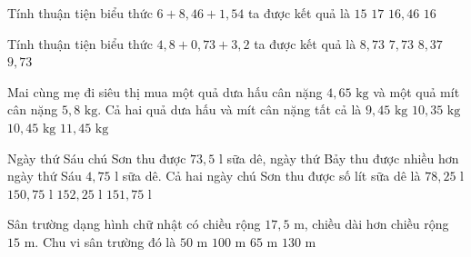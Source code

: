 \begin{ex} %
Tính thuận tiện biểu thức $6 + 8{,}46 + 1{,}54$ ta được kết quả là
\choice
{$15$}
{$17$}
{$16{,}46$}
{\True $16$}
\end{ex}

\begin{ex} %
Tính thuận tiện biểu thức $4{,}8 + 0{,}73 + 3{,}2$ ta được kết quả là
\choice
{\True $8{,}73$}
{$7{,}73$}
{$8{,}37$}
{$9{,}73$}
\end{ex}

\begin{ex} %
Mai cùng mẹ đi siêu thị mua một quả dưa hấu cân nặng $4{,}65\text{ kg}$ và một quả mít cân nặng $5{,}8\text{ kg}$. Cả hai quả dưa hấu và mít cân nặng tất cả là
\choice
{$9{,}45\text{ kg}$}
{$10{,}35\text{ kg}$}
{\True $10{,}45\text{ kg}$}
{$11{,}45\text{ kg}$}
\end{ex}

\begin{ex} %
Ngày thứ Sáu chú Sơn thu được $73{,}5\text{ l}$ sữa dê, ngày thứ Bảy thu được nhiều hơn ngày thứ Sáu $4{,}75\text{ l}$ sữa dê. Cả hai ngày chú Sơn thu được số lít sữa dê là
\choice
{$78{,}25\text{ l}$}
{$150{,}75\text{ l}$}
{$152{,}25\text{ l}$}
{\True $151{,}75\text{ l}$}
\end{ex}

\begin{ex} %
Sân trường dạng hình chữ nhật có chiều rộng $17{,}5\text{ m}$, chiều dài hơn chiều rộng $15\text{ m}$. Chu vi sân trường đó là
\choice
{$50\text{ m}$}
{\True $100\text{ m}$}
{$65\text{ m}$}
{$130\text{ m}$}
\end{ex}

